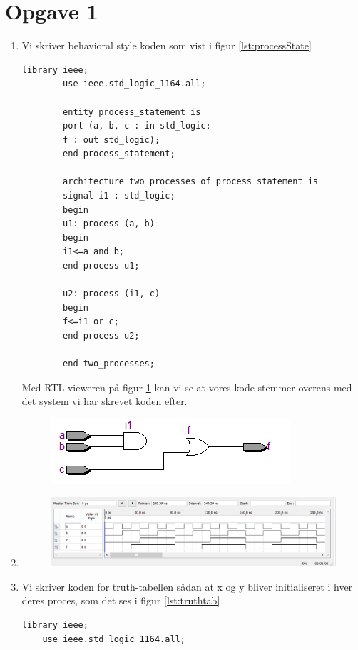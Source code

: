 \section{Opgave 1}
\begin{enumerate}
	\item[1)]
	Vi skriver behavioral style koden som vist i figur \ref{lst:processState}
		
		\begin{lstlisting}[caption={Behavioral style kode for en AND og OR gate},label={lst:processState}]
		library ieee;
		use ieee.std_logic_1164.all;
		
		entity process_statement is 
		port (a, b, c : in std_logic;
		f : out std_logic);
		end process_statement;
		
		architecture two_processes of process_statement is
		signal i1 : std_logic;
		begin
		u1: process (a, b)
		begin
		i1<=a and b;
		end process u1;
		
		u2: process (i1, c)
		begin
		f<=i1 or c;
		end process u2;
		
		end two_processes;
		\end{lstlisting}
		Med RTL-vieweren på figur \ref{fig:RTL process}  kan vi se at vores kode stemmer overens med det system vi har skrevet koden efter.
		\begin{figure}[h]
			\centering
			\includegraphics[scale=0.8]{pictures/Oevelse5/opg1/RTL_process.JPG}
			\caption{}
			\label{fig:RTL process}
		\end{figure}
		\item[2)]
		\begin{figure}[h]
			\centering
			\includegraphics[scale=0.8]{pictures/Oevelse5/opg1/func_sim_process.JPG}
			\caption{}
			\label{fig:Functional simulation process koden}
		\end{figure}
	\item[3)]
	Vi skriver koden for truth-tabellen sådan at x og y bliver initialiseret i hver deres proces, som det ses i figur \ref{lst:truthtab} 
	\begin{lstlisting}[caption={Behavioral style kode for truth tabellen},label={lst:truthtab}]
	library ieee;
	use ieee.std_logic_1164.all;
	

\end{lstlisting}
\end{enumerate}
